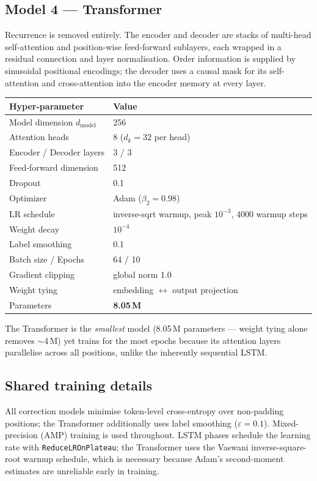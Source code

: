 \documentclass[11pt,a4paper]{article}
\begin{document}
\subsection{Model 4 --- Transformer}
Recurrence is removed entirely. The encoder and decoder are stacks of
multi-head self-attention and position-wise feed-forward sublayers, each wrapped
in a residual connection and layer normalisation. Order information is supplied
by sinusoidal positional encodings; the decoder uses a causal mask for its
self-attention and cross-attention into the encoder memory at every layer.

\begin{center}
\begin{tabular}{ll}
\toprule
Hyper-parameter & Value \\
\midrule
Model dimension $d_{\text{model}}$ & 256 \\
Attention heads                    & 8 ($d_k=32$ per head) \\
Encoder / Decoder layers           & 3 / 3 \\
Feed-forward dimension             & 512 \\
Dropout                            & 0.1 \\
Optimizer                          & Adam ($\beta_2=0.98$) \\
LR schedule                        & inverse-sqrt warmup, peak $10^{-3}$, 4000 warmup steps \\
Weight decay                       & $10^{-4}$ \\
Label smoothing                    & 0.1 \\
Batch size / Epochs                & 64 / 10 \\
Gradient clipping                  & global norm 1.0 \\
Weight tying                       & embedding $\leftrightarrow$ output projection \\
Parameters                         & \textbf{8.05\,M} \\
\bottomrule
\end{tabular}
\end{center}

The Transformer is the \emph{smallest} model (8.05\,M parameters --- weight
tying alone removes $\sim$4\,M) yet trains for the most epochs because its
attention layers parallelise across all positions, unlike the inherently
sequential LSTM.

\subsection{Shared training details}
All correction models minimise token-level cross-entropy over non-padding
positions; the Transformer additionally uses label smoothing ($\varepsilon=0.1$).
Mixed-precision (AMP) training is used throughout. LSTM phases schedule the
learning rate with \texttt{ReduceLROnPlateau}; the Transformer uses the
Vaswani inverse-square-root warmup schedule, which is necessary because Adam's
second-moment estimates are unreliable early in training.
\end{document}
